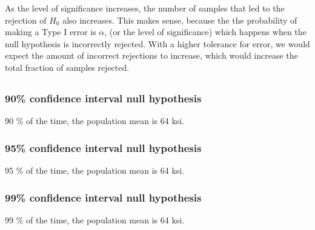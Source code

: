 \documentclass[letterpaper]{article}
\begin{document}

As the level of significance increases, the number of samples that led to the
rejection of $H_0$ also increases. This makes sense, because the the probability
of making a Type I error is $\alpha$, (or the level of significance) which
happens when the null hypothesis is incorrectly rejected. With a higher
tolerance for error, we would expect the amount of incorrect rejections to
increase, which would increase the total fraction of samples rejected.

\subsection{}%




\subsubsection*{90\% confidence interval null hypothesis}
90 \% of the time, the population mean is 64 ksi.

\subsubsection*{95\% confidence interval null hypothesis}
95 \% of the time, the population mean is 64 ksi.

\subsubsection*{99\% confidence interval null hypothesis}
99 \% of the time, the population mean is 64 ksi.
\end{document}
